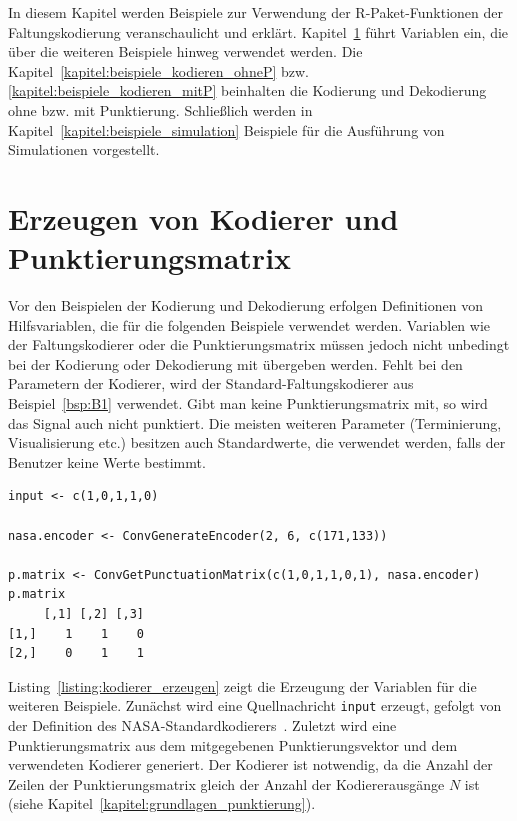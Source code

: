 In diesem Kapitel werden Beispiele zur Verwendung der R-Paket-Funktionen der Faltungskodierung veranschaulicht und erklärt. Kapitel~\ref{kapitel:beispiele_kodierer} führt Variablen ein, die über die weiteren Beispiele hinweg verwendet werden. Die Kapitel~\ref{kapitel:beispiele_kodieren_ohneP} bzw. \ref{kapitel:beispiele_kodieren_mitP} beinhalten die Kodierung und Dekodierung ohne bzw. mit Punktierung. Schließlich werden in Kapitel~\ref{kapitel:beispiele_simulation} Beispiele für die Ausführung von Simulationen vorgestellt. 

\section{Erzeugen von Kodierer und Punktierungsmatrix}
\label{kapitel:beispiele_kodierer}
Vor den Beispielen der Kodierung und Dekodierung erfolgen Definitionen von Hilfsvariablen, die für die folgenden Beispiele verwendet werden. Variablen wie der Faltungskodierer oder die Punktierungsmatrix müssen jedoch nicht unbedingt bei der Kodierung oder Dekodierung mit übergeben werden. Fehlt bei den Parametern der Kodierer, wird der Standard-Faltungskodierer aus Beispiel~\ref{bsp:B1} verwendet. Gibt man keine Punktierungsmatrix mit, so wird das Signal auch nicht punktiert. Die meisten weiteren Parameter (Terminierung, Visualisierung etc.) besitzen auch Standardwerte, die verwendet werden, falls der Benutzer keine Werte bestimmt.

\begin{lstlisting}[caption=Erzeugung von Kodierer und Punktierungsmatrix, label={listing:kodierer_erzeugen}, float=!th]
input <- c(1,0,1,1,0)
 
nasa.encoder <- ConvGenerateEncoder(2, 6, c(171,133))

p.matrix <- ConvGetPunctuationMatrix(c(1,0,1,1,0,1), nasa.encoder)
p.matrix
     [,1] [,2] [,3]
[1,]    1    1    0
[2,]    0    1    1
\end{lstlisting}

Listing~\ref{listing:kodierer_erzeugen} zeigt die Erzeugung der Variablen für die weiteren Beispiele. Zunächst wird eine Quellnachricht \texttt{input} erzeugt, gefolgt von der Definition des NASA-Standardkodierers~\cite[S.~90]{morelos2006art}. Zuletzt wird eine Punktierungsmatrix aus dem mitgegebenen Punktierungsvektor und dem verwendeten Kodierer generiert. Der Kodierer ist notwendig, da die Anzahl der Zeilen der Punktierungsmatrix gleich der Anzahl der Kodiererausgänge $N$ ist (siehe Kapitel~\ref{kapitel:grundlagen_punktierung}).

